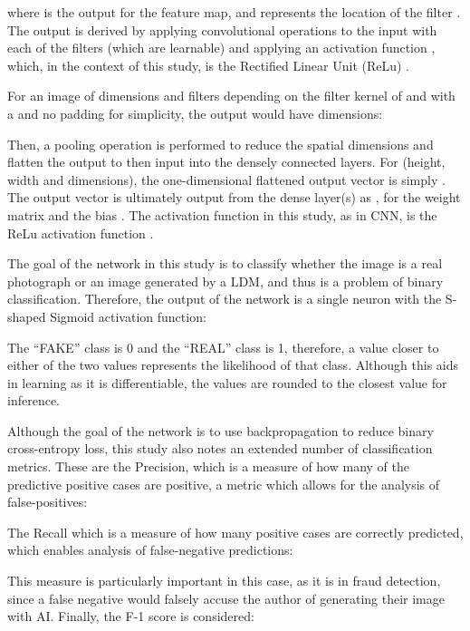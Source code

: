 \documentclass{article}
\begin{document}
where  is the output for the feature map, and  represents the location of the filter . The output is derived by applying convolutional operations to the input  with each of the filters (which are learnable) and applying an activation function , which, in the context of this study, is the Rectified Linear Unit (ReLu) . 

For an image of  dimensions and filters depending on the filter kernel of  and  with a  and no padding for simplicity, the output would have dimensions:



\noindent Then, a pooling operation is performed to reduce the spatial dimensions and flatten the output to then input into the densely connected layers. For  (height, width and dimensions), the one-dimensional flattened output vector is simply . The output vector  is ultimately output from the dense layer(s) as , for the weight matrix  and the bias . The activation function  in this study, as in CNN, is the ReLu activation function . 

The goal of the network in this study is to classify whether the image is a real photograph or an image generated by a LDM, and thus is a problem of binary classification. Therefore, the output of the network is a single neuron with the S-shaped Sigmoid activation function:



The ``FAKE'' class is 0 and the ``REAL'' class is 1, therefore, a value closer to either of the two values represents the likelihood of that class. Although this aids in learning as it is differentiable, the values are rounded to the closest value for inference. 

Although the goal of the network is to use backpropagation to reduce binary cross-entropy loss, this study also notes an extended number of classification metrics. These are the Precision, which is a measure of how many of the predictive positive cases are positive, a metric which allows for the analysis of false-positives:



\noindent The Recall which is a measure of how many positive cases are correctly predicted, which enables analysis of false-negative predictions:



\noindent This measure is particularly important in this case, as it is in fraud detection, since a false negative would falsely accuse the author of generating their image with AI. Finally, the F-1 score is considered:
\end{document}
